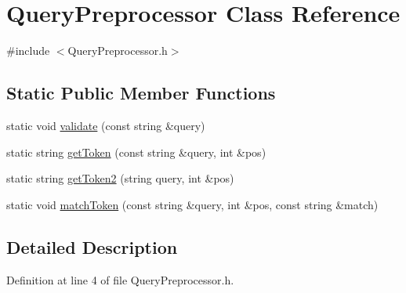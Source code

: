 \hypertarget{class_query_preprocessor}{\section{Query\-Preprocessor Class Reference}
\label{class_query_preprocessor}
}


{\ttfamily \#include $<$Query\-Preprocessor.\-h$>$}

\subsection*{Static Public Member Functions}
\begin{DoxyCompactItemize}
\item 
static void \hyperlink{class_query_preprocessor_a5b62339c1d0d39cddae46f45d27768cc}{validate} (const string \&query)
\item 
static string \hyperlink{class_query_preprocessor_a55b03e92388658b41bd49f8793f2c6c0}{get\-Token} (const string \&query, int \&pos)
\item 
static string \hyperlink{class_query_preprocessor_ad938ed3419d12d5042eb6e60644784ec}{get\-Token2} (string query, int \&pos)
\item 
static void \hyperlink{class_query_preprocessor_acbc3ea7f109b243143e16ac1b8afb5ea}{match\-Token} (const string \&query, int \&pos, const string \&match)
\end{DoxyCompactItemize}


\subsection{Detailed Description}


Definition at line 4 of file Query\-Preprocessor.\-h.



